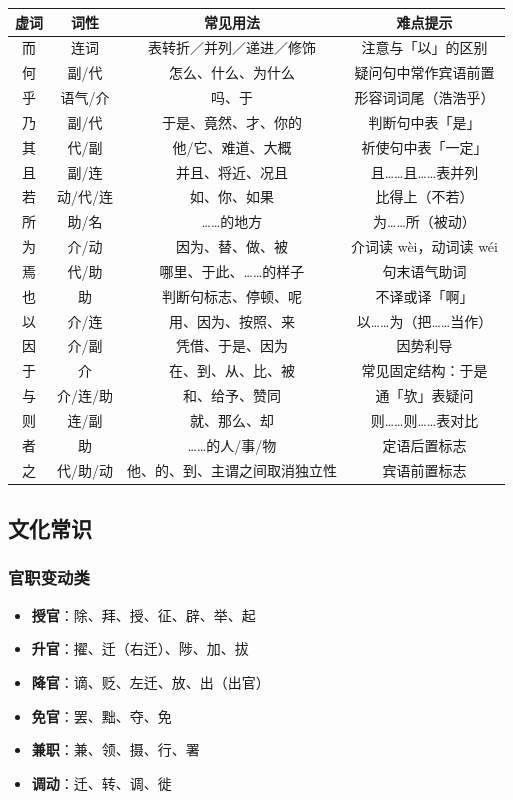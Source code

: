 \begin{center}
\begin{tabular}{c|c|c|c}
\textbf{虚词} & \textbf{词性} & \textbf{常见用法} & \textbf{难点提示} \\ \hline
而 & 连词 & 表转折／并列／递进／修饰 & 注意与「以」的区别 \\
何 & 副/代 & 怎么、什么、为什么 & 疑问句中常作宾语前置 \\
乎 & 语气/介 & 吗、于 & 形容词词尾（浩浩乎） \\
乃 & 副/代 & 于是、竟然、才、你的 & 判断句中表「是」 \\
其 & 代/副 & 他/它、难道、大概 & 祈使句中表「一定」 \\
且 & 副/连 & 并且、将近、况且 & 且……且……表并列 \\
若 & 动/代/连 & 如、你、如果 & 比得上（不若） \\
所 & 助/名 & ……的地方 & 为……所（被动） \\
为 & 介/动 & 因为、替、做、被 & 介词读 wèi，动词读 wéi \\
焉 & 代/助 & 哪里、于此、……的样子 & 句末语气助词 \\
也 & 助 & 判断句标志、停顿、呢 & 不译或译「啊」 \\
以 & 介/连 & 用、因为、按照、来 & 以……为（把……当作） \\
因 & 介/副 & 凭借、于是、因为 & 因势利导 \\
于 & 介 & 在、到、从、比、被 & 常见固定结构：于是 \\
与 & 介/连/助 & 和、给予、赞同 & 通「欤」表疑问 \\
则 & 连/副 & 就、那么、却 & 则……则……表对比 \\
者 & 助 & ……的人/事/物 & 定语后置标志 \\
之 & 代/助/动 & 他、的、到、主谓之间取消独立性 & 宾语前置标志 \\
\end{tabular}
\end{center}

\newpage

\subsection{文化常识}

\subsubsection{官职变动类}

\begin{itemize}
  \item \textbf{授官}：除、拜、授、征、辟、举、起
  \item \textbf{升官}：擢、迁（右迁）、陟、加、拔
  \item \textbf{降官}：谪、贬、左迁、放、出（出官）
  \item \textbf{免官}：罢、黜、夺、免
  \item \textbf{兼职}：兼、领、摄、行、署
  \item \textbf{调动}：迁、转、调、徙
\end{itemize}

